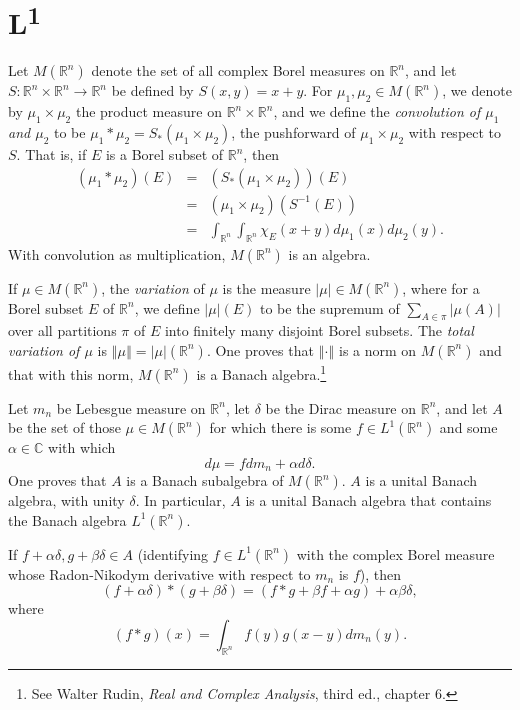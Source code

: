 \documentclass{article}
\newcommand{\norm}[1]{\left\Vert #1 \right\Vert}
\theoremstyle{definition}
\begin{document}
\section{L\textsuperscript{1}}
\label{convolvesection}
Let $M(\mathbb{R}^n)$ denote the set of all complex Borel measures on $\mathbb{R}^n$, 
and let $S:\mathbb{R}^n \times \mathbb{R}^n \to \mathbb{R}^n$ be defined by $S(x,y)=x+y$.
For $\mu_1, \mu_2 \in M(\mathbb{R}^n)$, we denote by $\mu_1 \times \mu_2$ the product measure on
$\mathbb{R}^n \times \mathbb{R}^n$, and we define
the {\em convolution of $\mu_1$ and $\mu_2$} to be $\mu_1 * \mu_2 = S_*(\mu_1 \times \mu_2)$, the pushforward of
$\mu_1 \times \mu_2$ with respect to $S$. That is,
if $E$ is a Borel subset of $\mathbb{R}^n$, then
\begin{eqnarray*}
(\mu_1 * \mu_2)(E) &=& (S_*(\mu_1 \times \mu_2))(E)\\
&=& (\mu_1 \times \mu_2)(S^{-1}(E))\\
& =& \int_{\mathbb{R}^n} \int_{\mathbb{R}^n} \chi_E(x+y) d\mu_1(x) d\mu_2(y).
\end{eqnarray*}
With convolution as multiplication, $M(\mathbb{R}^n)$ is an algebra.

If $\mu \in M(\mathbb{R}^n)$, the {\em variation} of $\mu$ is the measure $|\mu| \in M(\mathbb{R}^n)$, where for a Borel subset $E$ of $\mathbb{R}^n$,
we define $|\mu|(E)$ to be the supremum of $\sum_{A \in \pi} |\mu(A)|$ over all partitions $\pi$ of $E$ into finitely many disjoint Borel subsets.
The {\em total variation of $\mu$} is $\norm{\mu}=|\mu|(\mathbb{R}^n)$. One proves that $\norm{\cdot}$ is a norm on $M(\mathbb{R}^n)$ and that
with this norm, $M(\mathbb{R}^n)$ is a Banach algebra.\footnote{See
Walter Rudin, {\em Real and Complex Analysis}, third ed., chapter 6.}
 

Let $m_n$ be Lebesgue measure on $\mathbb{R}^n$,  let $\delta$ be the Dirac  measure on $\mathbb{R}^n$,
and let $A$ be the set of those $\mu \in M(\mathbb{R}^n)$ for which there is some $f \in L^1(\mathbb{R}^n)$ and some $\alpha \in \mathbb{C}$
with which
\[
d\mu = fdm_n + \alpha d\delta.
\]
One proves that $A$ is a Banach subalgebra of $M(\mathbb{R}^n)$. $A$ is a unital Banach algebra, with unity $\delta$.
In particular, $A$ is a unital Banach algebra that contains
the Banach algebra $L^1(\mathbb{R}^n)$.

If $f+\alpha \delta, g+\beta \delta \in A$ (identifying $f \in L^1(\mathbb{R}^n)$ with the complex Borel measure whose
Radon-Nikodym derivative with respect to $m_n$ is $f$), then
\begin{equation}
(f+\alpha \delta)*(g+\beta \delta) = (f*g+\beta f + \alpha g) + \alpha \beta \delta,
\label{convolveproduct}
\end{equation}
where 
\[
(f*g)(x) = \int_{\mathbb{R}^n} f(y)g(x-y) dm_n(y).
\]
\end{document}
